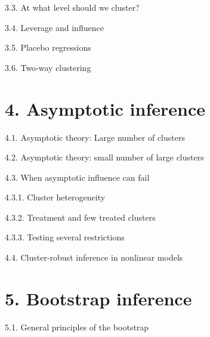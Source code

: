 \documentclass[xcolor=svgnames,aspectratio=169]{beamer}
\begin{document}
\begin{frame}{3.3. At what level should we cluster?}
\end{frame}

\begin{frame}{3.4. Leverage and influence}
\end{frame}

\begin{frame}{3.5. Placebo regressions}
\end{frame}

\begin{frame}{3.6. Two-way clustering}
\end{frame}

\section{4. Asymptotic inference}

\begin{frame}{4.1. Asymptotic theory: Large number of clusters}
\end{frame}

\begin{frame}{4.2. Asymptotic theory: small number of large clusters}
\end{frame}

\begin{frame}{4.3. When asymptotic influence can fail}
\end{frame}

\begin{frame}{4.3.1. Cluster heterogeneity}
\end{frame}

\begin{frame}{4.3.2. Treatment and few treated clusters}
\end{frame}

\begin{frame}{4.3.3. Testing several restrictions}
\end{frame}

\begin{frame}{4.4. Cluster-robust inference in nonlinear models}
\end{frame}

\section{5. Bootstrap inference}

\begin{frame}{5.1. General principles of the bootstrap}
\end{frame}
\end{document}
